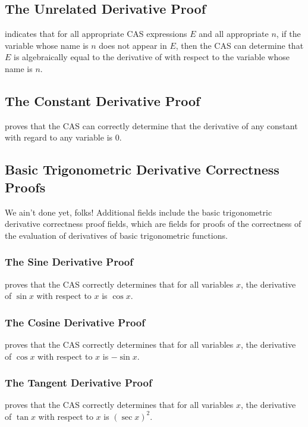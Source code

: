 \documentclass{report}
\begin{document}
\subsection{The Unrelated Derivative Proof}
  indicates that for all appropriate  CAS expressions \(E\) and all appropriate \(n\), if the variable whose name is \(n\) does not appear in \(E\), then the  CAS can determine that \(E\) is algebraically equal to the derivative of  with respect to the variable whose name is \(n\).

\subsection{The Constant Derivative Proof}
  proves that the  CAS can correctly determine that the derivative of any constant with regard to any variable is \(0\).

\subsection{Basic Trigonometric Derivative Correctness Proofs}
We ain't done yet, folks!  Additional fields include the basic trigonometric derivative correctness proof fields, which are fields for proofs of the correctness of the evaluation of derivatives of basic trigonometric functions.

\subsubsection{The Sine Derivative Proof}
  proves that the  CAS correctly determines that for all variables \(x\), the derivative of \(\sin x\) with respect to \(x\) is \(\cos x\).

\subsubsection{The Cosine Derivative Proof}
  proves that the  CAS correctly determines that for all variables \(x\), the derivative of \(\cos x\) with respect to \(x\) is \(- \sin x\).

\subsubsection{The Tangent Derivative Proof}
  proves that the  CAS correctly determines that for all variables \(x\), the derivative of \(\tan x\) with respect to \(x\) is \(\left(\sec x\right)^2\).
\end{document}
